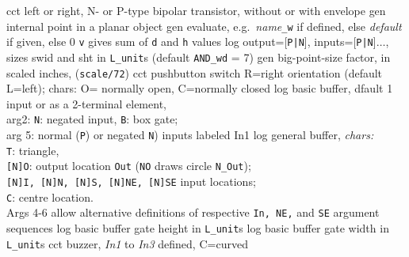 %
  {cct}%
  {left or right, N- or P-type bipolar transistor, without or with envelope 
    }%
%
  {gen}%
  {internal point in a planar object}%
%
  {gen}%
  {evaluate, e.g.\ {\sl name}{\tt \_w} if defined, else {\sl default\/}%
   if given, else 0 {\tt v} gives sum of {\tt d} and {\tt h} values
     }%
%
  {log}%
  {output=[{\tt P|N}], inputs=[{\tt P|N}]$\ldots$, sizes swid and sht
  in {\tt L\_unit}s (default {\tt AND\_wd} = 7)
    }%
%
  {gen}%
  {big-point-size factor, in scaled inches, ({\tt *scale/72})}%
%
  {cct}%
  {pushbutton switch R=right orientation (default L=left);
     chars: O= normally open, C=normally closed }%
%
  {log}%
  {basic buffer, dfault 1 input or as a 2-terminal element,\\
    arg2: {\tt N}: negated input, {\tt B}: box gate;\\
    arg 5: normal ({\tt P}) or negated {\tt N}) inputs labeled In1 
    }%
%
  {log}%
  {general buffer, {\sl chars:}\\
            {\tt T}: triangle,\\
            {\tt [N]O}: output location {\tt Out}%
            ({\tt NO} draws circle {\tt N\_Out});\\
            {\tt [N]I, [N]N, [N]S, [N]NE, [N]SE} input locations;\\
            {\tt C}: centre location.\\
            Args 4-6 allow alternative
            definitions of respective {\tt In, NE,}%
            and {\tt SE} argument sequences }%
%
  {log}%
  {basic buffer gate height in {\tt L\_unit}s}%
%
  {log}%
  {basic buffer gate width in {\tt L\_unit}s}%
%
  {cct}%
  {buzzer, {\sl In1} to {\sl In3} defined, C=curved
   }%
%
%
